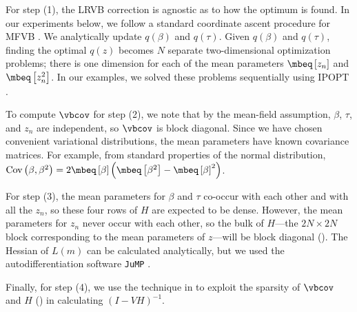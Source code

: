 For step (1), the LRVB correction is agnostic as to how the optimum
is found. In our experiments below, we
follow a standard
coordinate ascent procedure for MFVB \cite{bishop:2006:pattern}. We analytically update
$q\left(\beta\right)$ and $q\left(\tau\right)$.
Given $q\left(\beta\right)$ and $q\left(\tau\right)$, finding the
optimal $q\left(z\right)$ becomes $N$ separate two-dimensional optimization
problems; there is one dimension for each of the mean parameters $\mbeq \left[ z_n \right]$ and $\mbeq \left[ z_n^2 \right]$.
In our examples, we solved these problems sequentially using
IPOPT \cite{ipopt:package}.

To compute $\vbcov$ for step (2),
we note that by the mean-field assumption,
$\beta$, $\tau$, and $z_{n}$ are independent, so $\vbcov$ is block
diagonal. Since we have chosen convenient variational distributions,
the mean parameters have known covariance matrices. For example, from
standard properties of the normal distribution,
$\textrm{Cov}\left(\beta,\beta^{2}\right)=2\mbeq\left[\beta\right]$$\left(\mbeq\left[\beta^{2}\right]-\mbeq\left[\beta\right]^{2}\right)$.

For step (3), the mean parameters for $\beta$ and $\tau$ co-occur with each other
and with all the $z_{n}$, so these four rows of $H$ are expected
to be dense. However, the mean parameters for $z_{n}$ never occur
with each other, so the bulk of $H$---the $2N\times2N$ block corresponding
to the mean parameters of $z$---will be block diagonal ().
The Hessian of $L\left(m\right)$ can be calculated analytically,
but we used the autodifferentiation software \texttt{JuMP} \cite{JuMP:LubinDunningIJOC}.

Finally, for step (4),
we use the technique in 
to exploit the sparsity of $\vbcov$ and $H$ () in calculating $(I-VH)^{-1}$.

